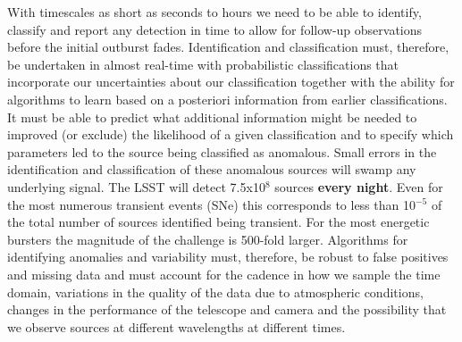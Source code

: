 \documentclass[useAMS,usenatbib,tightenlines,11pt,preprint]{aastex}
\begin{document}
With timescales as short as seconds to hours we need to be able to
identify, classify and report any detection in time to allow for
follow-up observations before the initial outburst
fades. Identification and classification must, therefore, be
undertaken in almost real-time with probabilistic classifications that
incorporate our uncertainties about our classification together with
the ability for algorithms to learn based on a posteriori information
from earlier classifications. It must be able to predict what
additional information might be needed to improved (or exclude) the
likelihood of a given classification and to specify which parameters
led to the source being classified as anomalous. Small errors in the
identification and classification of these anomalous sources will
swamp any underlying signal. The LSST will detect 7.5x10$^8$ sources
{\bf every night}. Even for the most numerous transient events (SNe)
this corresponds to less than 10$^{-5}$ of the total number of sources
identified being transient. For the most energetic bursters the
magnitude of the challenge is 500-fold larger.  Algorithms for
identifying anomalies and variability must, therefore, be robust to
false positives and missing data and must account for the cadence in
how we sample the time domain, variations in the quality of the data
due to atmospheric conditions, changes in the performance of the
telescope and camera and the possibility that we observe sources at
different wavelengths at different times.
\end{document}
